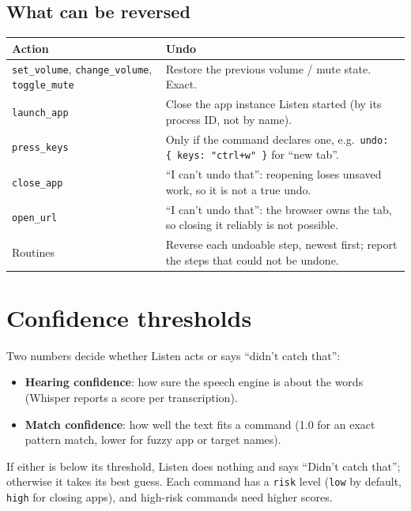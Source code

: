\documentclass[11pt,a4paper]{article}
\begin{document}
\subsection{What can be reversed}
\begin{center}
\renewcommand{\arraystretch}{1.2}
\begin{tabularx}{\textwidth}{l X}
\toprule
\textbf{Action} & \textbf{Undo} \\
\midrule
\texttt{set\_volume}, \texttt{change\_volume}, \texttt{toggle\_mute} & Restore the previous volume / mute state. Exact. \\
\texttt{launch\_app} & Close the app instance Listen started (by its process ID, not by name). \\
\texttt{press\_keys} & Only if the command declares one, e.g.\ \texttt{undo: \{ keys: "ctrl+w" \}} for ``new tab''. \\
\texttt{close\_app} & ``I can't undo that'': reopening loses unsaved work, so it is not a true undo. \\
\texttt{open\_url} & ``I can't undo that'': the browser owns the tab, so closing it reliably is not possible. \\
Routines & Reverse each undoable step, newest first; report the steps that could not be undone. \\
\bottomrule
\end{tabularx}
\end{center}

\section{Confidence thresholds}\label{sec:thresholds}

Two numbers decide whether Listen acts or says ``didn't catch that'':
\begin{itemize}[nosep]
  \item \textbf{Hearing confidence}: how sure the speech engine is about the words (Whisper
        reports a score per transcription).
  \item \textbf{Match confidence}: how well the text fits a command (1.0 for an exact pattern
        match, lower for fuzzy app or target names).
\end{itemize}

\noindent If either is below its threshold, Listen does nothing and says ``Didn't catch
that''; otherwise it takes its best guess. Each command has a \texttt{risk} level
(\texttt{low} by default, \texttt{high} for closing apps), and high-risk commands need higher
scores.
\end{document}

